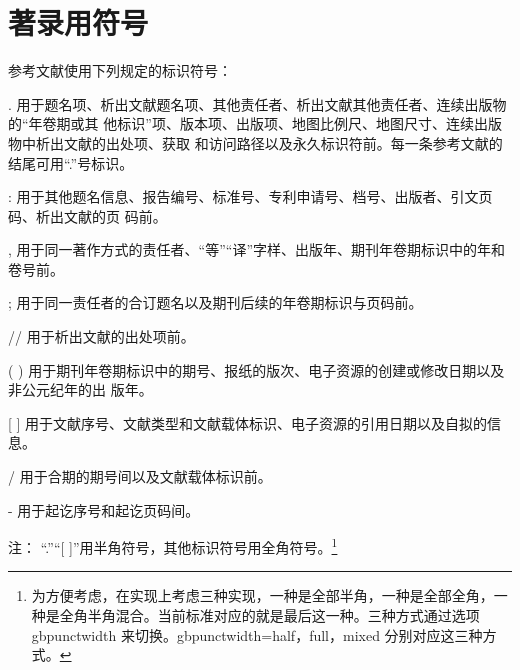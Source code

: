 \documentclass[twoside]{article}%
\begin{document}
\section{著录用符号}

参考文献使用下列规定的标识符号：

. 用于题名项、析出文献题名项、其他责任者、析出文献其他责任者、连续出版物的“年卷期或其
他标识”项、版本项、出版项、地图比例尺、地图尺寸、连续出版物中析出文献的出处项、获取
和访问路径以及永久标识符前。每一条参考文献的结尾可用“.”号标识。

: 用于其他题名信息、报告编号、标准号、专利申请号、档号、出版者、引文页码、析出文献的页
码前。

, 用于同一著作方式的责任者、“等”“译”字样、出版年、期刊年卷期标识中的年和卷号前。

; 用于同一责任者的合订题名以及期刊后续的年卷期标识与页码前。

// 用于析出文献的出处项前。

( ) 用于期刊年卷期标识中的期号、报纸的版次、电子资源的创建或修改日期以及非公元纪年的出
版年。

[ ] 用于文献序号、文献类型和文献载体标识、电子资源的引用日期以及自拟的信息。

/ 用于合期的期号间以及文献载体标识前。

- 用于起讫序号和起讫页码间。

注： “.”“[ ]”用半角符号，其他标识符号用全角符号。\footnote{为方便考虑，在实现上考虑三种实现，一种是全部半角，一种是全部全角，一种是全角半角混合。当前标准对应的就是最后这一种。三种方式通过选项 gbpunctwidth 来切换。gbpunctwidth=half，full，mixed 分别对应这三种方式。}




\end{document}
